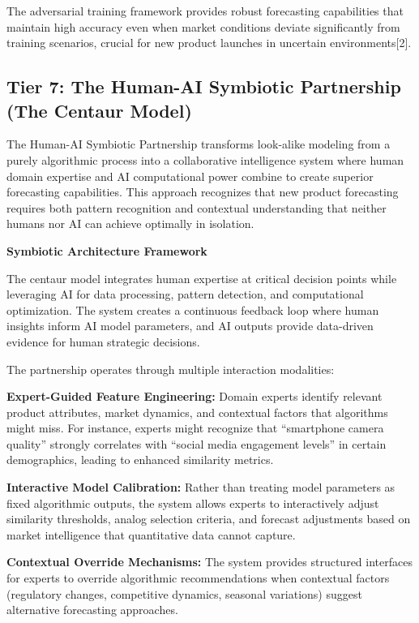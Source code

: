 \documentclass{article}
\begin{document}
The adversarial training framework provides robust forecasting capabilities that maintain high accuracy even when market conditions deviate significantly from training scenarios, crucial for new product launches in uncertain environments[2].

\subsection{Tier 7: The Human-AI Symbiotic Partnership (The Centaur Model)}

The Human-AI Symbiotic Partnership transforms look-alike modeling from a purely algorithmic process into a collaborative intelligence system where human domain expertise and AI computational power combine to create superior forecasting capabilities. This approach recognizes that new product forecasting requires both pattern recognition and contextual understanding that neither humans nor AI can achieve optimally in isolation.

\textbf{Symbiotic Architecture Framework}

The centaur model integrates human expertise at critical decision points while leveraging AI for data processing, pattern detection, and computational optimization. The system creates a continuous feedback loop where human insights inform AI model parameters, and AI outputs provide data-driven evidence for human strategic decisions.

The partnership operates through multiple interaction modalities:

\textbf{Expert-Guided Feature Engineering:} Domain experts identify relevant product attributes, market dynamics, and contextual factors that algorithms might miss. For instance, experts might recognize that ``smartphone camera quality'' strongly correlates with ``social media engagement levels'' in certain demographics, leading to enhanced similarity metrics.

\textbf{Interactive Model Calibration:} Rather than treating model parameters as fixed algorithmic outputs, the system allows experts to interactively adjust similarity thresholds, analog selection criteria, and forecast adjustments based on market intelligence that quantitative data cannot capture.

\textbf{Contextual Override Mechanisms:} The system provides structured interfaces for experts to override algorithmic recommendations when contextual factors (regulatory changes, competitive dynamics, seasonal variations) suggest alternative forecasting approaches.
\end{document}
